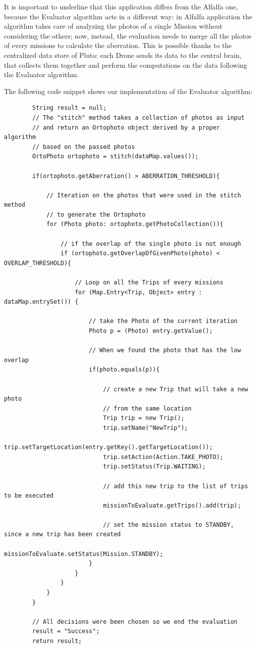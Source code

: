 It is important to underline that this application differs from the Alfalfa\cite{alfalfa} one, because the Evaluator algorithm acts in a different way: 
in Alfalfa\cite{alfalfa} application the algorithm takes care of analyzing the photos of a single Mission without considering the others; now, instead, the evaluation needs to merge all the photos of every missions to calculate the aberration. 
This is possible thanks to the centralized data store of Pluto:
each Drone sends its data to the central brain, that collects them together and perform the computations on the data following the Evaluator algorithm.


The following code snippet shows our implementation of the Evaluator algorithm:
\\
\begin{lstlisting}
		String result = null;
		// The "stitch" method takes a collection of photos as input
        // and return an Ortophoto object derived by a proper algorithm
        // based on the passed photos
		OrtoPhoto ortophoto = stitch(dataMap.values());
		
		if(ortophoto.getAberration() > ABERRATION_THRESHOLD){
			
			// Iteration on the photos that were used in the stitch method
            // to generate the Ortophoto
			for (Photo photo: ortophoto.getPhotoCollection()){
				
				// if the overlap of the single photo is not enough
				if (ortophoto.getOverlapOfGivenPhoto(photo) < OVERLAP_THRESHOLD){
					
					// Loop on all the Trips of every missions
					for (Map.Entry<Trip, Object> entry : dataMap.entrySet()) {
						
						// take the Photo of the current iteration
						Photo p = (Photo) entry.getValue();
						
						// When we found the photo that has the low overlap
						if(photo.equals(p)){
							
							// create a new Trip that will take a new photo
                            // from the same location
							Trip trip = new Trip();
							trip.setName("NewTrip");
							trip.setTargetLocation(entry.getKey().getTargetLocation());
							trip.setAction(Action.TAKE_PHOTO);
							trip.setStatus(Trip.WAITING);

							// add this new trip to the list of trips to be executed
							missionToEvaluate.getTrips().add(trip);
							
							// set the mission status to STANDBY, since a new trip has been created
							missionToEvaluate.setStatus(Mission.STANDBY);
						}
					}		
				}
			}
		}
        
        // All decisions were been chosen so we end the evaluation
		result = "Success";
		return result;
\end{lstlisting}

